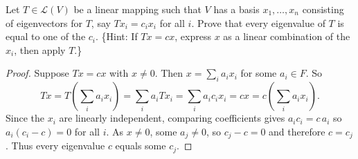 \begin{tcolorbox}[title=Problem 6, breakable]
    Let $T \in \mathcal{L}(V)$ be a linear mapping such that $V$ has a basis $x_1, \ldots, x_n$ consisting of eigenvectors for $T$, say $Tx_i = c_i x_i$ for all $i$. Prove that every eigenvalue of $T$ is equal to one of the $c_i$. \{Hint: If $Tx = cx$, express $x$ as a linear combination of the $x_i$, then apply $T$.\}
\end{tcolorbox}

\begin{proof}
    Suppose $Tx = cx$ with $x \neq 0$.
    Then $x = \sum_i a_i x_i$ for some $a_i \in F$.
    So
    \[Tx = T\left( \sum_i a_i x_i \right) = \sum_i a_i T x_i = \sum_i a_i c_i x_i = cx = c\left( \sum_i a_i x_i \right).\]
    Since the $x_i$ are linearly independent, comparing coefficients gives $a_i c_i = c\, a_i$ so $a_i(c_i - c) = 0$ for all $i$.
    As $x \neq 0$, some $a_j \neq 0$, so $c_j - c = 0$ and therefore $c = c_j$.
    Thus every eigenvalue $c$ equals some $c_j$.
\end{proof}
